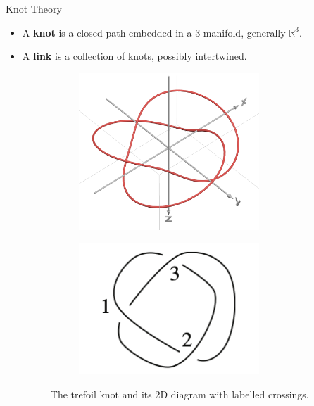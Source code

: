 \documentclass[final,10pt]{beamer}
\newlength{\colwidth}
\newcommand{\R}{\mathbb{R}}
\begin{document}
\begin{frame}[t]
\begin{columns}[t]
\begin{column}{\colwidth}
\begin{block}{Knot Theory}
\begin{itemize}
    \item A \textbf{knot} is a closed path embedded in a 3-manifold, generally $\R^3$.
    \item A \textbf{link} is a collection of knots, possibly intertwined.
    \begin{figure}[!h]
        \centering
        \begin{subfigure}{0.4\textwidth}
            \includegraphics[width=0.8\textwidth]{Figures/trefoil_3d.png}
        \end{subfigure}
        \begin{subfigure}{0.4\textwidth}
            \includegraphics[width=0.8\textwidth]{Figures/Trefoil.png}
        \end{subfigure}
        \caption{The trefoil knot and its 2D diagram with labelled crossings.}
    \end{figure}\vspace*{-0.5em}

\end{itemize}
\end{block}
\end{column}
\end{columns}
\end{frame}
\end{document}
